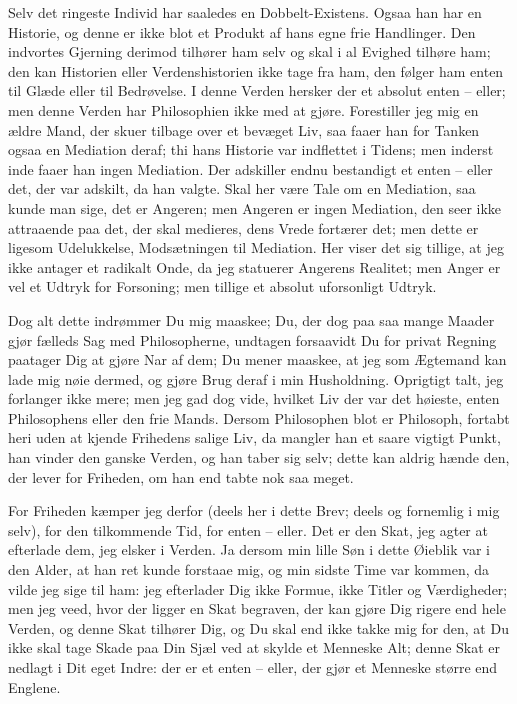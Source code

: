 \documentclass[12pt,a4paper]{article}
\begin{document}
Selv det ringeste Individ har saaledes en Dobbelt-Existens. Ogsaa han har en Historie, og denne er ikke blot et Produkt af hans egne frie Handlinger. Den indvortes Gjerning derimod tilhører ham selv og skal i al Evighed tilhøre ham; den kan Historien eller Verdenshistorien ikke tage fra ham, den følger ham enten til Glæde eller til Bedrøvelse. I denne Verden hersker der et absolut enten – eller; men denne Verden har Philosophien ikke med at gjøre. Forestiller jeg mig en ældre Mand, der skuer tilbage over et bevæget Liv, saa faaer han for Tanken ogsaa en Mediation deraf; thi hans Historie var indflettet i Tidens; men inderst inde faaer han ingen Mediation. Der adskiller endnu bestandigt et enten – eller det, der var adskilt, da han valgte. Skal her være Tale om en Mediation, saa kunde man sige, det er Angeren; men Angeren er ingen Mediation, den seer ikke attraaende paa det, der skal medieres, dens Vrede fortærer det; men dette er ligesom Udelukkelse, Modsætningen til Mediation. Her viser det sig tillige, at jeg ikke antager et radikalt Onde, da jeg statuerer Angerens Realitet; men Anger er vel et Udtryk for Forsoning; men tillige et absolut uforsonligt Udtryk.

Dog alt dette indrømmer Du mig maaskee; Du, der dog paa saa mange Maader gjør fælleds Sag med Philosopherne, undtagen forsaavidt Du for privat Regning paatager Dig at gjøre Nar af dem; Du mener maaskee, at jeg som Ægtemand kan lade mig nøie dermed, og gjøre Brug deraf i min Husholdning. Oprigtigt talt, jeg forlanger ikke mere; men jeg gad dog vide, hvilket Liv der var det høieste, enten Philosophens eller den frie Mands. Dersom Philosophen blot er Philosoph, fortabt heri uden at kjende Frihedens salige Liv, da mangler han et saare vigtigt Punkt, han vinder den ganske Verden, og han taber sig selv; dette kan aldrig hænde den, der lever for Friheden, om han end tabte nok saa meget.

For Friheden kæmper jeg derfor (deels her i dette Brev; deels og fornemlig i mig selv), for den tilkommende Tid, for enten – eller. Det er den Skat, jeg agter at efterlade dem, jeg elsker i Verden. Ja dersom min lille Søn i dette Øieblik var i den Alder, at han ret kunde forstaae mig, og min sidste Time var kommen, da vilde jeg sige til ham: jeg efterlader Dig ikke Formue, ikke Titler og Værdigheder; men jeg veed, hvor der ligger en Skat begraven, der kan gjøre Dig rigere end hele Verden, og denne Skat tilhører Dig, og Du skal end ikke takke mig for den, at Du ikke skal tage Skade paa Din Sjæl ved at skylde et Menneske Alt; denne Skat er nedlagt i Dit eget Indre: der er et enten – eller, der gjør et Menneske større end Englene.
\end{document}
